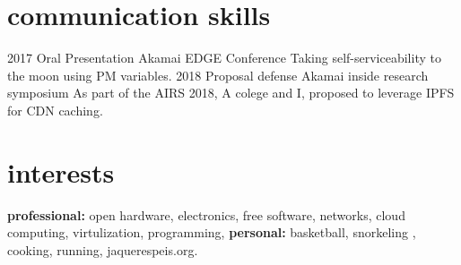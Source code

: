 \documentclass[]{friggeri-cv}
\begin{document}

\section{communication skills}

\begin{entrylist}
\entry
{2017}
{Oral Presentation}
{Akamai EDGE Conference}
{Taking self-serviceability to the moon using PM variables.}
\entry
{2018}
{Proposal defense}
{Akamai inside research symposium}
{As part of the AIRS 2018, A colege and I, proposed to leverage IPFS for CDN caching.}
\end{entrylist}

% 

\section{interests}

\textbf{professional:} open hardware, electronics, free software, networks, cloud computing, virtulization, programming, \textbf{personal:} basketball, snorkeling , cooking, running, jaquerespeis.org.
\end{document}
